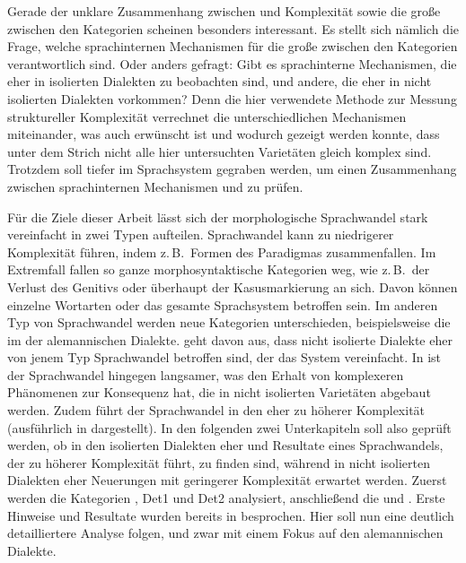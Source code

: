 Gerade der unklare Zusammenhang zwischen  und Komplexität sowie die große  zwischen den Kategorien scheinen besonders interessant. Es stellt sich nämlich die Frage, welche sprachinternen Mechanismen für die große  zwischen den Kategorien verantwortlich sind. Oder anders gefragt: Gibt es sprachinterne Mechanismen, die eher in isolierten Dialekten zu beobachten sind, und andere, die eher in nicht isolierten Dialekten vorkommen? Denn die hier verwendete Methode zur Messung struktureller Komplexität verrechnet die unterschiedlichen Mechanismen miteinander, was auch erwünscht ist und wodurch gezeigt werden konnte, dass unter dem Strich nicht alle hier untersuchten Varietäten gleich komplex sind. Trotzdem soll tiefer im Sprachsystem gegraben werden, um einen Zusammenhang zwischen sprachinternen Mechanismen und  zu prüfen.

Für die Ziele dieser Arbeit lässt sich der morphologische Sprachwandel stark vereinfacht in zwei Typen aufteilen. Sprachwandel kann zu niedrigerer Komplexität führen, indem z.\,B.\ Formen des Paradigmas zusammenfallen. Im Extremfall fallen so ganze morphosyntaktische Kategorien weg, wie z.\,B.\ der Verlust des Genitivs oder überhaupt der Kasusmarkierung an sich. Davon können einzelne Wortarten oder das gesamte Sprachsystem betroffen sein. Im anderen Typ von Sprachwandel werden neue Kategorien unterschieden, beispielsweise die  im  der alemannischen Dialekte. \citet{Trudgill2011} geht davon aus, dass nicht isolierte Dialekte eher von jenem Typ Sprachwandel betroffen sind, der das System vereinfacht. In  ist der Sprachwandel hingegen langsamer, was den Erhalt von komplexeren Phänomenen zur Konsequenz hat, die in nicht isolierten Varietäten abgebaut werden. Zudem führt der Sprachwandel in den  eher zu höherer Komplexität (ausführlich in  dargestellt). In den folgenden zwei Unterkapiteln soll also geprüft werden, ob in den isolierten Dialekten eher  und Resultate eines Sprachwandels, der zu höherer Komplexität führt, zu finden sind, während in nicht isolierten Dialekten eher Neuerungen mit geringerer Komplexität erwartet werden. Zuerst werden die Kategorien , Det1 und Det2 analysiert, anschließend die  und . Erste Hinweise und Resultate wurden bereits in  besprochen. Hier soll nun eine deutlich detailliertere Analyse folgen, und zwar mit einem Fokus auf den alemannischen Dialekte.

